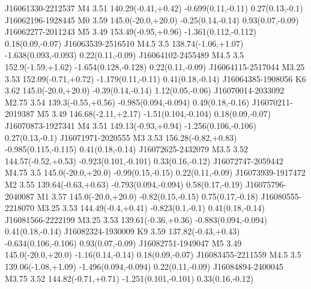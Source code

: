 J16061330-2212537  M4     3.51                   140.29(-0.41,+0.42)  -0.699(0.11,-0.11)                0.27(0.13,-0.1)
J16062196-1928445  M0     3.59                   145.0(-20.0,+20.0)   -0.25(0.14,-0.14)                 0.93(0.07,-0.09)
J16062277-2011243  M5     3.49                   153.49(-0.95,+0.96)  -1.361(0.112,-0.112)              0.18(0.09,-0.07)
J16063539-2516510  M4.5   3.5                    138.74(-1.06,+1.07)  -1.638(0.093,-0.093)              0.22(0.11,-0.09)
J16064102-2455489  M4.5   3.5                    152.9(-1.59,+1.62)   -1.654(0.128,-0.128)              0.22(0.11,-0.09)
J16064115-2517044  M3.25  3.53                   152.09(-0.71,+0.72)  -1.179(0.11,-0.11)                0.41(0.18,-0.14)
J16064385-1908056  K6     3.62                   145.0(-20.0,+20.0)   -0.39(0.14,-0.14)                 1.12(0.05,-0.06)
J16070014-2033092  M2.75  3.54                   139.3(-0.55,+0.56)   -0.985(0.094,-0.094)              0.49(0.18,-0.16)
J16070211-2019387  M5     3.49                   146.68(-2.11,+2.17)  -1.51(0.104,-0.104)               0.18(0.09,-0.07)
J16070873-1927341  M4     3.51                   149.13(-0.93,+0.94)  -1.256(0.106,-0.106)              0.27(0.13,-0.1)
J16071971-2020555  M3     3.53                   156.28(-0.82,+0.83)  -0.985(0.115,-0.115)              0.41(0.18,-0.14)
J16072625-2432079  M3.5   3.52                   144.57(-0.52,+0.53)  -0.923(0.101,-0.101)              0.33(0.16,-0.12)
J16072747-2059442  M4.75  3.5                    145.0(-20.0,+20.0)   -0.99(0.15,-0.15)                 0.22(0.11,-0.09)
J16073939-1917472  M2     3.55                   139.64(-0.63,+0.63)  -0.793(0.094,-0.094)              0.58(0.17,-0.19)
J16075796-2040087  M1     3.57                   145.0(-20.0,+20.0)   -0.82(0.15,-0.15)                 0.75(0.17,-0.18)
J16080555-2218070  M3.25  3.53                   144.49(-0.4,+0.41)   -0.823(0.1,-0.1)                  0.41(0.18,-0.14)
J16081566-2222199  M3.25  3.53                   139.61(-0.36,+0.36)  -0.883(0.094,-0.094)              0.41(0.18,-0.14)
J16082324-1930009  K9     3.59                   137.82(-0.43,+0.43)  -0.634(0.106,-0.106)              0.93(0.07,-0.09)
J16082751-1949047  M5     3.49                   145.0(-20.0,+20.0)   -1.16(0.14,-0.14)                 0.18(0.09,-0.07)
J16083455-2211559  M4.5   3.5                    139.06(-1.08,+1.09)  -1.496(0.094,-0.094)              0.22(0.11,-0.09)
J16084894-2400045  M3.75  3.52                   144.82(-0.71,+0.71)  -1.251(0.101,-0.101)              0.33(0.16,-0.12)
